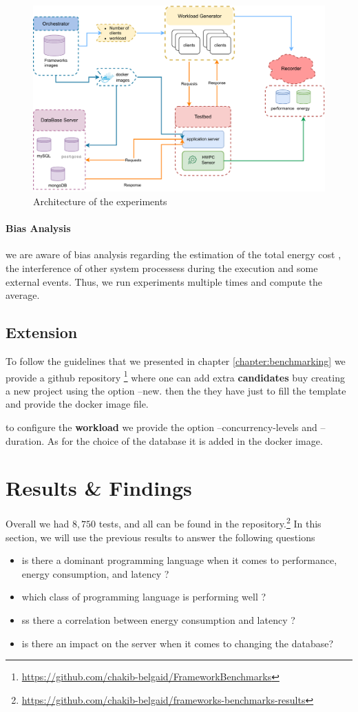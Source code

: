 \begin{figure}[bht]
    \centering
    \includegraphics[width=.8\columnwidth]{imgs/architecture}
    \caption[Architecture]{Architecture of the experiments}
    \label{fig:architecture}
\end{figure}


\paragraph{Bias Analysis}
we are aware of bias analysis regarding the estimation of the total energy cost , the interference of other system processess during the execution and some external events. Thus, we run experiments multiple times and compute the average.

\subsection{Extension}
To follow the guidelines that we presented in chapter \ref{chapter:benchmarking} we provide a github repository \footnote{\url{https://github.com/chakib-belgaid/FrameworkBenchmarks}} where one can add extra \textbf{candidates} buy creating a new project using the option --new. then the they have just to fill the template and provide the docker image file.

to configure the \textbf{workload} we provide the option --concurrency-levels and --duration.
As for the choice of the database it is added in the docker image.


\section{Results \& Findings}
Overall we had $8,750$ tests, and all can be found in the repository.\footnote{\url{https://github.com/chakib-belgaid/frameworks-benchmarks-results}}
In this section, we will use the previous results to answer the following questions
\begin{itemize}
    \item is there a dominant programming language when it comes to performance, energy consumption, and latency ?
    \item which class of programming language is performing well ?
    \item ss there a correlation between energy consumption and latency ?
    \item is there an impact on the server when it comes to changing the database?
\end{itemize}

